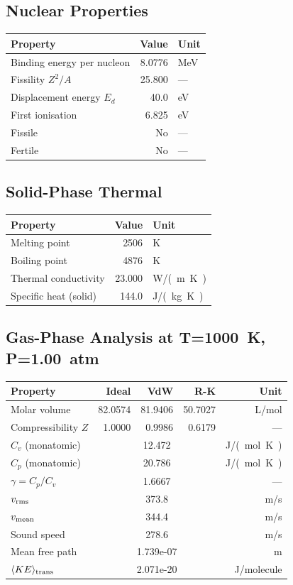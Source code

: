 \documentclass[11pt,a4paper]{article}
\begin{document}
\subsection{Nuclear Properties}
\begin{tabular}{lrl}
  \toprule
  Property & Value & Unit \\
  \midrule
  Binding energy per nucleon & 8.0776 & \si{MeV} \\
  Fissility $Z^2/A$ & 25.800 & --- \\
  Displacement energy $E_d$ & 40.0 & \si{eV} \\
  First ionisation & 6.825 & \si{eV} \\
  Fissile & No & --- \\
  Fertile & No & --- \\
  \bottomrule
\end{tabular}

\subsection{Solid-Phase Thermal}
\begin{tabular}{lrl}
  \toprule
  Property & Value & Unit \\
  \midrule
  Melting point & 2506 & \si{K} \\
  Boiling point & 4876 & \si{K} \\
  Thermal conductivity & 23.000 & \si{W/(m.K)} \\
  Specific heat (solid) & 144.0 & \si{J/(kg.K)} \\
  \bottomrule
\end{tabular}

\subsection{Gas-Phase Analysis at T=\SI{1000}{K}, P=\SI{1.00}{atm}}
\begin{tabular}{lrrrr}
  \toprule
  Property & Ideal & VdW & R-K & Unit \\
  \midrule
  Molar volume & 82.0574 & 81.9406 & 50.7027 & \si{L/mol} \\
  Compressibility $Z$ & 1.0000 & 0.9986 & 0.6179 & --- \\
  \midrule
  $C_v$ (monatomic) & \multicolumn{3}{c}{12.472} & \si{J/(mol.K)} \\
  $C_p$ (monatomic) & \multicolumn{3}{c}{20.786} & \si{J/(mol.K)} \\
  $\gamma = C_p/C_v$ & \multicolumn{3}{c}{1.6667} & --- \\
  $v_{\rm rms}$ & \multicolumn{3}{c}{373.8} & \si{m/s} \\
  $v_{\rm mean}$ & \multicolumn{3}{c}{344.4} & \si{m/s} \\
  Sound speed & \multicolumn{3}{c}{278.6} & \si{m/s} \\
  Mean free path & \multicolumn{3}{c}{1.739e-07} & \si{m} \\
  $\langle KE \rangle_{\rm trans}$ & \multicolumn{3}{c}{2.071e-20} & \si{J/molecule} \\
  \bottomrule
\end{tabular}
\end{document}
